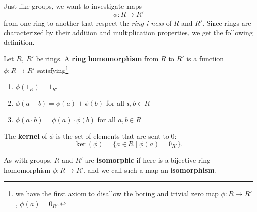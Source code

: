 \documentclass[math1530-lecture-notes]{subfiles}
\begin{document}
Just like groups, we want to investigate maps \[
  \phi:R\to R'
\] from one ring to another that respect the \textit{ring-i-ness} of $R$ and $R'$. Since rings are
characterized by their addition and multiplication properties, we get the following definition.

\begin{definition}{}
  Let $R,\ R'$ be rings. A \textbf{ring homomorphism} from $R$ to $R'$ is a function $\phi:R\to R'$ 
  satisfying\footnote{we have the first axiom to disallow the boring and trivial zero map $\phi:R\to
  R'$, $\phi(a)=0_{R'}$.}
  \begin{enumerate}
    \item $\phi(1_R)=1_{R'}$
    \item $\phi(a+b) = \phi(a) + \phi(b)$ for all $a,b\in R$
    \item $\phi(a\cdot b)=\phi(a)\cdot \phi(b)$ for all $a,b\in R$
  \end{enumerate}

  The \textbf{kernel} of $\phi$ is the set of elements that are sent to 0: \[
    \ker(\phi)=\{ a\in R \mid \phi(a)=0_{R'} \}
  .\] 

  As with groups, $R$ and $R'$ are \textbf{isomorphic} if here is a bijective ring homomorphism
  $\phi:R\to R'$, and we call such a map an \textbf{isomorphism}.
\end{definition}
\end{document}
